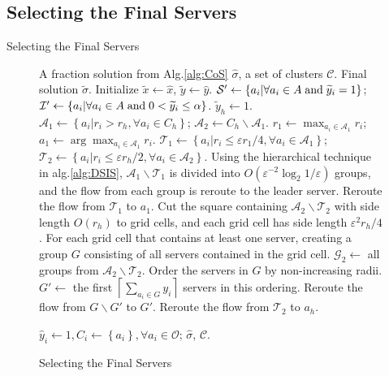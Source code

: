 \documentclass[11pt,a4paper]{article}
\begin{document}
\subsection{Selecting the Final Servers}
Selecting the Final Servers
\begin{figure}[!t]
	\renewcommand{\algorithmicrequire}{\textbf{Input:}}
	\renewcommand{\algorithmicensure}{\textbf{Output:}}
	\begin{algorithm}[H]
		\caption{Selecting the Final Servers}
		\begin{algorithmic}[1]\label{alg:SFS}
			\REQUIRE A fraction solution from Alg.\ref{alg:CoS} $\widehat{\sigma}$, a set of clusters $\mathcal{C}$.
			\ENSURE Final solution $\widetilde \sigma $.
			\STATE Initialize $\widetilde x \leftarrow \widehat x$, $\widetilde y \leftarrow \widehat y$.
			\STATE ${\mathcal{S}'} \leftarrow \left\{ {{a_i}|\forall{a_i} \in A\; {\rm{and}} \; {{\widetilde y}_i} = 1} \right\}$; ${\mathcal{I}'} \leftarrow \left\{ {{a_i}|\forall{a_i} \in A\; {\rm{and}} \; 0<{{\widetilde y}_i} \le \alpha} \right\}$.
			\STATE $\widetilde{y}_h \leftarrow 1$.
			\ELSE
			\STATE $\mathcal{A}_1 \leftarrow \left\{a_i | r_i > r_h, \forall a_i \in C_h\right\}$; $\mathcal{A}_2 \leftarrow C_h \backslash \mathcal{A}_1$.
			\STATE $r_1 \leftarrow \max_{a_i \in \mathcal{A}_1}r_i$; $a_1 \leftarrow \arg\max_{a_i \in \mathcal{A}_1}r_i$.
			\STATE $\mathcal{T}_1 \leftarrow \left\{ a_i | r_i \le \varepsilon r_1 / 4, \forall a_i \in \mathcal{A}_1\right\}$; $\mathcal{T}_2 \leftarrow \left\{ a_i | r_i \le \varepsilon r_h / 2, \forall a_i \in \mathcal{A}_2 \right\}$.
			\STATE Using the hierarchical technique in alg.\ref{alg:DSIS}, $\mathcal{A}_1 \backslash \mathcal{T}_1$ is divided into $O(\varepsilon^{-2}\log_2{1/\varepsilon})$ groups, and the flow from each group is reroute to the leader server.
			\STATE Reroute the flow from $\mathcal{T}_1$ to $a_1$.
			\STATE Cut the square containing $\mathcal{A}_2 \backslash \mathcal{T}_2$ with side length $O(r_h)$ to grid cells, and each grid cell has side length $\varepsilon^2 r_h / 4$.
			\STATE For each grid cell that contains at least one server, creating a group $G$ consisting of all servers contained in the grid cell.
			\STATE $\mathcal{G}_2 \leftarrow$ all groups from $\mathcal{A}_2 \backslash \mathcal{T}_2$. 
			\STATE Order the servers in $G$ by non-increasing radii.
			\STATE $G'\leftarrow$ the first $\left\lceil \sum\nolimits_{{a_i} \in G} {{{ y}_{i}}}  \right \rceil$ servers in this ordering.
			\STATE Reroute the flow from $G\backslash G'$ to $G'$.
			\ENDFOR
			\STATE Reroute the flow from $\mathcal{T}_2$ to $a_h$.
			\ENDIF
			\ENDFOR
			
			
			\STATE $\widehat y_i \leftarrow 1, C_i \leftarrow \left\{a_i\right\}, \forall a_i \in \mathcal{O} $; 
			\RETURN $\widehat{\sigma}$, $\mathcal{C}$.
		\end{algorithmic}
	\end{algorithm}
\end{figure}
\end{document}
